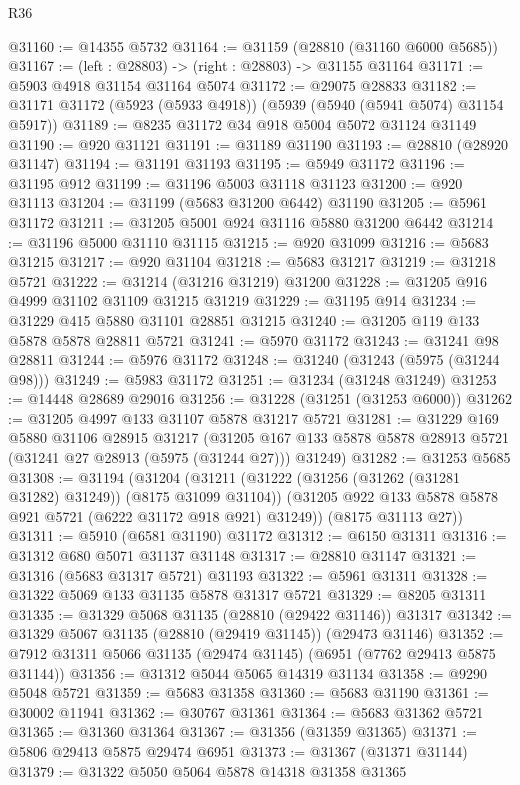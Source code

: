\begin{lexlean}{R36}
\begin{coremodule}
@31160 := @14355 @5732
@31164 := @31159 (@28810 (@31160 @6000 @5685))
@31167 := (left : @28803) -> (right : @28803) -> @31155 @31164
@31171 := @5903 @4918 @31154 @31164 @5074
@31172 := @29075 @28833
@31182 := @31171 @31172 (@5923 (@5933 @4918)) (@5939 (@5940 (@5941 @5074) @31154 @5917))
@31189 := @8235 @31172 @34 @918 @5004 @5072 @31124 @31149
@31190 := @920 @31121
@31191 := @31189 @31190
@31193 := @28810 (@28920 @31147)
@31194 := @31191 @31193
@31195 := @5949 @31172
@31196 := @31195 @912
@31199 := @31196 @5003 @31118 @31123
@31200 := @920 @31113
@31204 := @31199 (@5683 @31200 @6442) @31190
@31205 := @5961 @31172
@31211 := @31205 @5001 @924 @31116 @5880 @31200 @6442
@31214 := @31196 @5000 @31110 @31115
@31215 := @920 @31099
@31216 := @5683 @31215
@31217 := @920 @31104
@31218 := @5683 @31217
@31219 := @31218 @5721
@31222 := @31214 (@31216 @31219) @31200
@31228 := @31205 @916 @4999 @31102 @31109 @31215 @31219
@31229 := @31195 @914
@31234 := @31229 @415 @5880 @31101 @28851 @31215
@31240 := @31205 @119 @133 @5878 @5878 @28811 @5721
@31241 := @5970 @31172
@31243 := @31241 @98 @28811
@31244 := @5976 @31172
@31248 := @31240 (@31243 (@5975 (@31244 @98)))
@31249 := @5983 @31172
@31251 := @31234 (@31248 @31249)
@31253 := @14448 @28689 @29016
@31256 := @31228 (@31251 (@31253 @6000))
@31262 := @31205 @4997 @133 @31107 @5878 @31217 @5721
@31281 := @31229
    @169
    @5880
    @31106
    @28915
    @31217
    (@31205 @167 @133 @5878 @5878 @28913 @5721 (@31241 @27 @28913 (@5975 (@31244 @27))) @31249)
@31282 := @31253 @5685
@31308 := @31194
    (@31204
      (@31211
        (@31222 (@31256 (@31262 (@31281 @31282) @31249)) (@8175 @31099 @31104))
        (@31205 @922 @133 @5878 @5878 @921 @5721 (@6222 @31172 @918 @921) @31249))
      (@8175 @31113 @27))
@31311 := @5910 (@6581 @31190) @31172
@31312 := @6150 @31311
@31316 := @31312 @680 @5071 @31137 @31148
@31317 := @28810 @31147
@31321 := @31316 (@5683 @31317 @5721) @31193
@31322 := @5961 @31311
@31328 := @31322 @5069 @133 @31135 @5878 @31317 @5721
@31329 := @8205 @31311
@31335 := @31329 @5068 @31135 (@28810 (@29422 @31146)) @31317
@31342 := @31329 @5067 @31135 (@28810 (@29419 @31145)) (@29473 @31146)
@31352 := @7912 @31311 @5066 @31135 (@29474 @31145) (@6951 (@7762 @29413 @5875 @31144))
@31356 := @31312 @5044 @5065 @14319 @31134
@31358 := @9290 @5048 @5721
@31359 := @5683 @31358
@31360 := @5683 @31190
@31361 := @30002 @11941
@31362 := @30767 @31361
@31364 := @5683 @31362 @5721
@31365 := @31360 @31364
@31367 := @31356 (@31359 @31365)
@31371 := @5806 @29413 @5875 @29474 @6951
@31373 := @31367 (@31371 @31144)
@31379 := @31322 @5050 @5064 @5878 @14318 @31358 @31365

\end{coremodule}
\end{lexlean}

